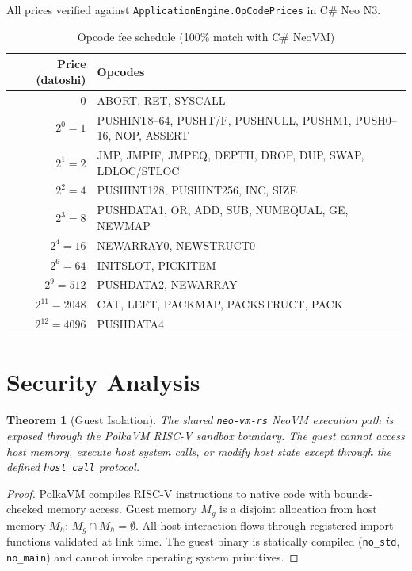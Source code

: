 \documentclass[11pt,a4paper]{article}
\newtheorem{theorem}{Theorem}[section]
\begin{document}
All prices verified against \texttt{ApplicationEngine.OpCodePrices} in C\# Neo N3.

\begin{table}[h]
\centering
\begin{tabular}{@{}rl@{}}
\toprule
\textbf{Price (datoshi)} & \textbf{Opcodes} \\
\midrule
0 & ABORT, RET, SYSCALL \\
$2^0 = 1$ & PUSHINT8--64, PUSHT/F, PUSHNULL, PUSHM1, PUSH0--16, NOP, ASSERT \\
$2^1 = 2$ & JMP, JMPIF, JMPEQ, DEPTH, DROP, DUP, SWAP, LDLOC/STLOC \\
$2^2 = 4$ & PUSHINT128, PUSHINT256, INC, SIZE \\
$2^3 = 8$ & PUSHDATA1, OR, ADD, SUB, NUMEQUAL, GE, NEWMAP \\
$2^4 = 16$ & NEWARRAY0, NEWSTRUCT0 \\
$2^6 = 64$ & INITSLOT, PICKITEM \\
$2^9 = 512$ & PUSHDATA2, NEWARRAY \\
$2^{11} = 2048$ & CAT, LEFT, PACKMAP, PACKSTRUCT, PACK \\
$2^{12} = 4096$ & PUSHDATA4 \\
\bottomrule
\end{tabular}
\caption{Opcode fee schedule (100\% match with C\# NeoVM)}
\label{tab:fees}
\end{table}

\section{Security Analysis}

\begin{theorem}[Guest Isolation]
\label{thm:isolation}
The shared \texttt{neo-vm-rs} NeoVM execution path is exposed through the PolkaVM RISC-V sandbox boundary. The guest cannot access host memory, execute host system calls, or modify host state except through the defined \texttt{host\_call} protocol.
\end{theorem}

\begin{proof}
PolkaVM compiles RISC-V instructions to native code with bounds-checked memory access. Guest memory $M_g$ is a disjoint allocation from host memory $M_h$: $M_g \cap M_h = \emptyset$. All host interaction flows through registered import functions validated at link time. The guest binary is statically compiled (\texttt{no\_std}, \texttt{no\_main}) and cannot invoke operating system primitives.
\end{proof}
\end{document}
